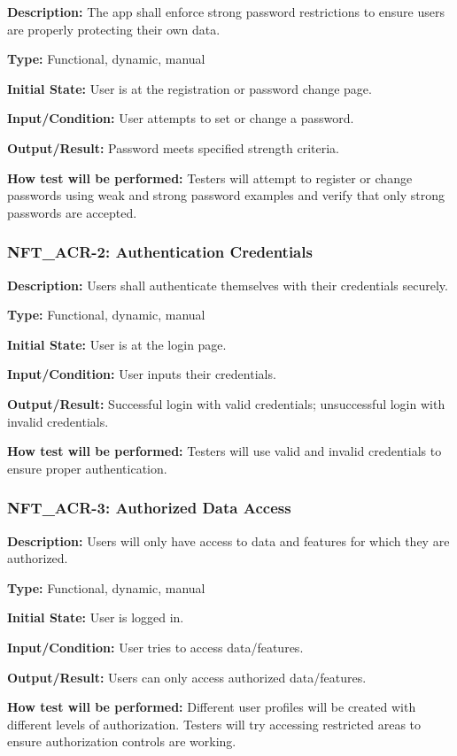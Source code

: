\documentclass[12pt, titlepage]{article}
\begin{document}
\textbf{Description: }The app shall enforce strong password restrictions to ensure users are properly protecting their own data.

\textbf{Type:} Functional, dynamic, manual

\textbf{Initial State:} User is at the registration or password change page.

\textbf{Input/Condition:} User attempts to set or change a password.

\textbf{Output/Result:} Password meets specified strength criteria.

\textbf{How test will be performed:} Testers will attempt to register or change passwords using weak and strong password examples and verify that only strong passwords are accepted.


\subsubsection*{\textbf{NFT\_ACR-2: Authentication Credentials}
}

\textbf{Description: }Users shall authenticate themselves with their credentials securely.

\textbf{Type: }Functional, dynamic, manual

\textbf{Initial State:} User is at the login page.

\textbf{Input/Condition: }User inputs their credentials.

\textbf{Output/Result: }Successful login with valid credentials; unsuccessful login with invalid credentials.

\textbf{How test will be performed:} Testers will use valid and invalid credentials to ensure proper authentication.


\subsubsection*{\textbf{NFT\_ACR-3: Authorized Data Access}
}

\textbf{Description: }Users will only have access to data and features for which they are authorized.

\textbf{Type: }Functional, dynamic, manual

\textbf{Initial State:} User is logged in.

\textbf{Input/Condition: }User tries to access data/features.

\textbf{Output/Result:} Users can only access authorized data/features.

\textbf{How test will be performed: }Different user profiles will be created with different levels of authorization. Testers will try accessing restricted areas to ensure authorization controls are working.
\newline
\end{document}
